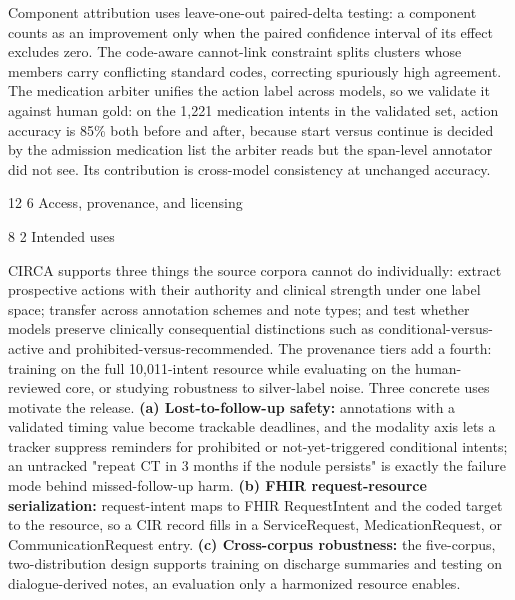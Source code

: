 \documentclass[3p,twocolumn]{elsarticle}
\makeatletter
\renewcommand\section{\@startsection {section}{1}{\z@}%
    {12\p@ \@plus 4\p@ \@minus 4\p@}%
    {6\p@ \@plus 4\p@ \@minus 3\p@}%
    {\normalsize\bfseries\boldmath}}
\renewcommand\subsection{\@startsection{subsection}{2}{\z@}%
    {8\p@ \@plus 4\p@ \@minus 4\p@}%
    {2\p@ \@plus 4\p@ \@minus 3\p@}%
    {\normalfont\normalsize\itshape}}
\makeatother
\begin{document}
Component attribution uses leave-one-out paired-delta testing: a component counts as an improvement only when the paired confidence interval of its effect excludes zero. The code-aware cannot-link constraint splits clusters whose members carry conflicting standard codes, correcting spuriously high agreement. The medication arbiter unifies the action label across models, so we validate it against human gold: on the 1,221 medication intents in the validated set, action accuracy is 85\% both before and after, because start versus continue is decided by the admission medication list the arbiter reads but the span-level annotator did not see. Its contribution is cross-model consistency at unchanged accuracy.






\section{Access, provenance, and licensing}\label{access-provenance-and-licensing}

\subsection{Intended uses}\label{intended-uses}

CIRCA supports three things the source corpora cannot do individually: extract prospective actions with their authority and clinical strength under one label space; transfer across annotation schemes and note types; and test whether models preserve clinically consequential distinctions such as conditional-versus-active and prohibited-versus-recommended. The provenance tiers add a fourth: training on the full 10,011-intent resource while evaluating on the human-reviewed core, or studying robustness to silver-label noise. Three concrete uses motivate the release. \textbf{(a) Lost-to-follow-up safety:} annotations with a validated timing value become trackable deadlines, and the modality axis lets a tracker suppress reminders for prohibited or not-yet-triggered conditional intents; an untracked "repeat CT in 3 months if the nodule persists" is exactly the failure mode behind missed-follow-up harm. \textbf{(b) FHIR request-resource serialization:} request-intent maps to FHIR RequestIntent and the coded target to the resource, so a CIR record fills in a ServiceRequest, MedicationRequest, or CommunicationRequest entry. \textbf{(c) Cross-corpus robustness:} the five-corpus, two-distribution design supports training on discharge summaries and testing on dialogue-derived notes, an evaluation only a harmonized resource enables.
\end{document}
